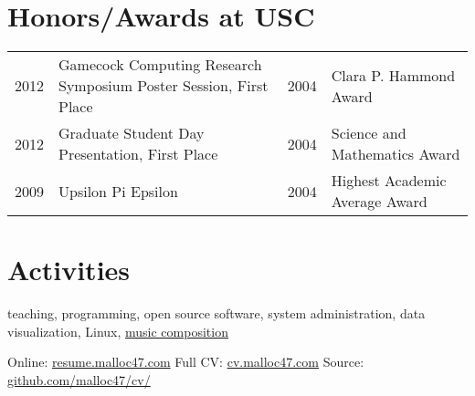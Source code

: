 \documentclass[10pt]{article}
\begin{document}
\section{Honors/Awards at USC}
\begin{tabularx}{\textwidth}{@{}r|X l|p{4.9cm}@{}}
2012 & \small{Gamecock Computing Research Symposium Poster Session,  First Place} &
2004 & Clara P. Hammond Award  \\

2012 & Graduate Student Day Presentation,  First Place &
2004 & Science and Mathematics Award \\

2009 & Upsilon Pi Epsilon &
2004 & Highest Academic Average Award \\
\end{tabularx}

\section{Activities}
teaching, programming, open source software, system administration,
data visualization, Linux,
\href{https://soundcloud.com/malloc47}{music composition}

\null\vfill
\footnotesize{
  Online:  \href{http://resume.malloc47.com}{resume.malloc47.com} \hfill
  Full CV: \href{http://cv.malloc47.com}{cv.malloc47.com} \hfill
  Source:  \href{https://github.com/malloc47/cv}{github.com/malloc47/cv/}
}

\pagestyle{myheadings}

\end{document}

